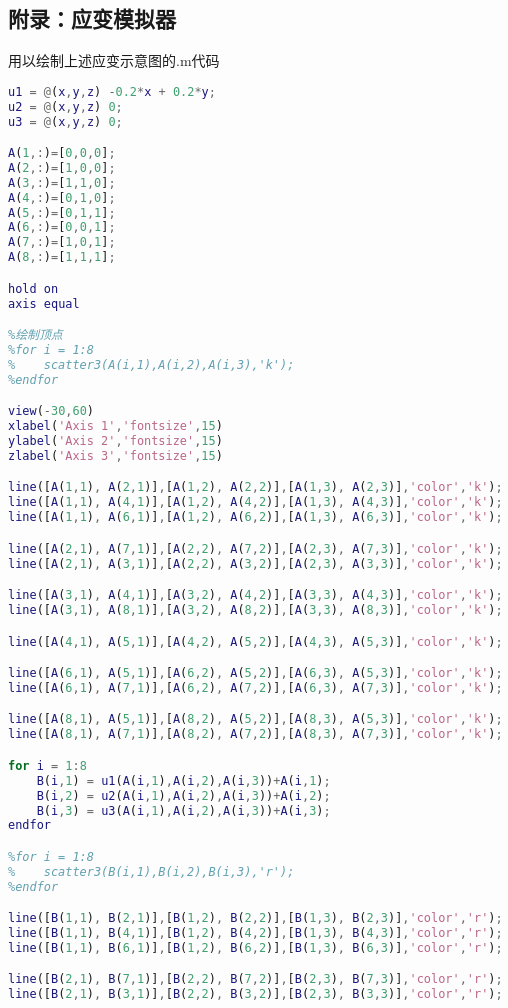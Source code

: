 \subsection{附录：应变模拟器}
用以绘制上述应变示意图的.m代码
\begin{lstlisting}[language=matlab]
%定义位移函数，你可以设置自己的线性位移函数
u1 = @(x,y,z) -0.2*x + 0.2*y;
u2 = @(x,y,z) 0;
u3 = @(x,y,z) 0;

A(1,:)=[0,0,0];
A(2,:)=[1,0,0];
A(3,:)=[1,1,0];
A(4,:)=[0,1,0];
A(5,:)=[0,1,1];
A(6,:)=[0,0,1];
A(7,:)=[1,0,1];
A(8,:)=[1,1,1];

hold on
axis equal

%绘制顶点
%for i = 1:8
%    scatter3(A(i,1),A(i,2),A(i,3),'k');
%endfor

view(-30,60)
xlabel('Axis 1','fontsize',15)
ylabel('Axis 2','fontsize',15)
zlabel('Axis 3','fontsize',15)

line([A(1,1), A(2,1)],[A(1,2), A(2,2)],[A(1,3), A(2,3)],'color','k');
line([A(1,1), A(4,1)],[A(1,2), A(4,2)],[A(1,3), A(4,3)],'color','k');
line([A(1,1), A(6,1)],[A(1,2), A(6,2)],[A(1,3), A(6,3)],'color','k');

line([A(2,1), A(7,1)],[A(2,2), A(7,2)],[A(2,3), A(7,3)],'color','k');
line([A(2,1), A(3,1)],[A(2,2), A(3,2)],[A(2,3), A(3,3)],'color','k');

line([A(3,1), A(4,1)],[A(3,2), A(4,2)],[A(3,3), A(4,3)],'color','k');
line([A(3,1), A(8,1)],[A(3,2), A(8,2)],[A(3,3), A(8,3)],'color','k');

line([A(4,1), A(5,1)],[A(4,2), A(5,2)],[A(4,3), A(5,3)],'color','k');

line([A(6,1), A(5,1)],[A(6,2), A(5,2)],[A(6,3), A(5,3)],'color','k');
line([A(6,1), A(7,1)],[A(6,2), A(7,2)],[A(6,3), A(7,3)],'color','k');

line([A(8,1), A(5,1)],[A(8,2), A(5,2)],[A(8,3), A(5,3)],'color','k');
line([A(8,1), A(7,1)],[A(8,2), A(7,2)],[A(8,3), A(7,3)],'color','k');

for i = 1:8
    B(i,1) = u1(A(i,1),A(i,2),A(i,3))+A(i,1);
    B(i,2) = u2(A(i,1),A(i,2),A(i,3))+A(i,2);
    B(i,3) = u3(A(i,1),A(i,2),A(i,3))+A(i,3);
endfor

%for i = 1:8
%    scatter3(B(i,1),B(i,2),B(i,3),'r');
%endfor

line([B(1,1), B(2,1)],[B(1,2), B(2,2)],[B(1,3), B(2,3)],'color','r');
line([B(1,1), B(4,1)],[B(1,2), B(4,2)],[B(1,3), B(4,3)],'color','r');
line([B(1,1), B(6,1)],[B(1,2), B(6,2)],[B(1,3), B(6,3)],'color','r');

line([B(2,1), B(7,1)],[B(2,2), B(7,2)],[B(2,3), B(7,3)],'color','r');
line([B(2,1), B(3,1)],[B(2,2), B(3,2)],[B(2,3), B(3,3)],'color','r');


\end{lstlisting}
